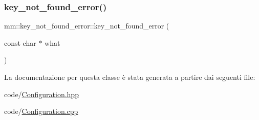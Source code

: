 \subsubsection{\texorpdfstring{key\+\_\+not\+\_\+found\+\_\+error()}{key\_not\_found\_error()}\hspace{0.1cm}{\footnotesize\ttfamily [2/2]}}
{\footnotesize\ttfamily mm\+::key\+\_\+not\+\_\+found\+\_\+error\+::key\+\_\+not\+\_\+found\+\_\+error (\begin{DoxyParamCaption}\item[{const char $\ast$}]{what }\end{DoxyParamCaption})}



La documentazione per questa classe è stata generata a partire dai seguenti file\+:\begin{DoxyCompactItemize}
\item 
code/\hyperlink{_configuration_8hpp}{Configuration.\+hpp}\item 
code/\hyperlink{_configuration_8cpp}{Configuration.\+cpp}\end{DoxyCompactItemize}
